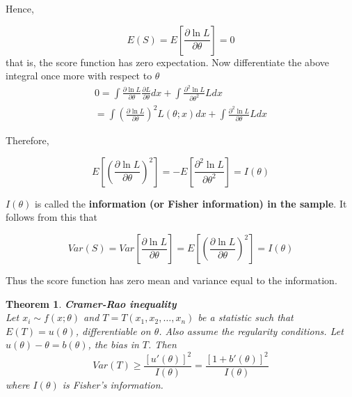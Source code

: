 \documentclass{article}
\newtheorem{theorem}{Theorem}[section]
\begin{document}
Hence,

\begin{equation*}
    E(S)=E \left[\frac{\partial \ln{L}}{\partial \theta} \right]=0
\end{equation*}
that is, the score function has zero expectation. Now differentiate the above integral once more with respect to \(\theta\)
\begin{equation*}
    \begin{split}
        0=\int \frac{\partial \ln{L}}{\partial \theta} \frac{\partial L}{\partial \theta} dx + \int \frac{\partial^2 \ln{L}}{\partial \theta^2} L dx\\
        =\int \left(\frac{\partial \ln{L}}{\partial \theta} \right)^2 L(\theta;x) dx + \int \frac{\partial^2 \ln{L}}{\partial \theta} L dx
    \end{split}
\end{equation*}

Therefore,

\begin{equation*}
    E \left[ \left(\frac{\partial \ln{L}}{\partial \theta} \right)^2 \right] = -E \left[\frac{\partial^2 \ln{L}}{\partial \theta^2} \right] = I(\theta)
\end{equation*}

\(I(\theta)\) is called the \textbf{information (or Fisher information) in the sample}. It follows from this that

\begin{equation*}
    Var(S)=Var \left[\frac{\partial \ln{L}}{\partial \theta} \right] = E \left[ \left( \frac{\partial \ln{L}}{\partial \theta} \right)^2 \right] = I(\theta)
\end{equation*}

Thus the score function has zero mean and variance equal to the information.

\begin{theorem}
    \textbf{Cramer-Rao inequality}\\
    Let \(x_i \sim f(x;\theta)\) and \(T=T(x_1,x_2,\dots,x_n)\) be a statistic such that \(E(T)=u(\theta)\), differentiable on \(\theta\). Also assume the regularity conditions. Let \(u(\theta)-\theta=b(\theta)\), the bias in \(T\). Then
    \begin{equation*}
        Var(T) \geq \frac{[u'(\theta)]^2}{I(\theta)} = \frac{[1+b'(\theta)]^2}{I(\theta)}
    \end{equation*}
    where \(I(\theta)\) is Fisher's information.
\end{theorem}
\end{document}
